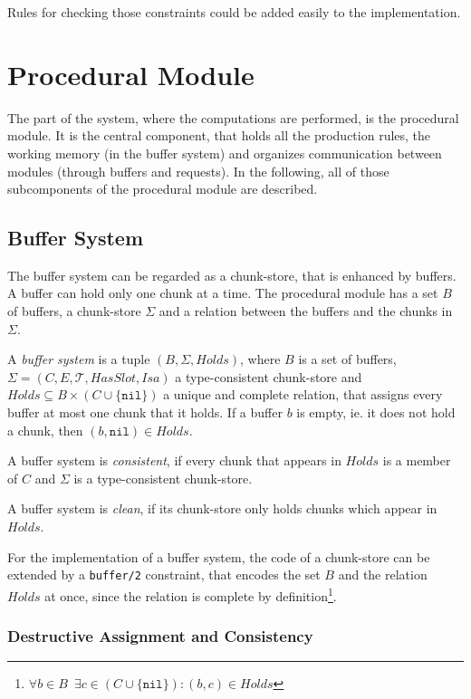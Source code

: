 Rules for checking those constraints could be added easily to the implementation.

\section{Procedural Module}

The part of the system, where the computations are performed, is the procedural module. It is the central component, that holds all the production rules, the working memory (in the buffer system) and organizes communication between modules (through buffers and requests). In the following, all of those subcomponents of the procedural module are described.

\subsection{Buffer System}

The buffer system can be regarded as a chunk-store, that is enhanced by buffers. A buffer can hold only one chunk at a time. The procedural module has a set $B$ of buffers, a chunk-store $\Sigma$ and a relation between the buffers and the chunks in $\Sigma$.

\begin{definition}
\label{def:buffer_system}
A \emph{buffer system} is a tuple $(B,\Sigma,Holds)$, where $B$ is a set of buffers, $\Sigma = (C, E, \mathcal{T}, HasSlot, Isa)$ a type-consistent chunk-store and $Holds \subseteq B \times (C \cup \{ \mathtt{nil} \})$ a unique and complete relation, that assigns every buffer at most one chunk that it holds. If a buffer $b$ is empty, ie. it does not hold a chunk, then $(b,\mathtt{nil}) \in Holds$.

A buffer system is \emph{consistent}, if every chunk that appears in $Holds$ is a member of $C$ and $\Sigma$ is a type-consistent chunk-store.

A buffer system is \emph{clean}, if its chunk-store only holds chunks which appear in $Holds$.
\end{definition}

For the implementation of a buffer system, the code of a chunk-store can be extended by a \verb|buffer/2| constraint, that encodes the set $B$ and the relation $Holds$ at once, since the relation is complete by definition\footnote{$\forall b \in B \enspace \exists c \in (C \cup \{ \mathtt{nil} \}): (b,c) \in Holds$}.

\subsubsection{Destructive Assignment and Consistency}
\label{destructive_assignment}

